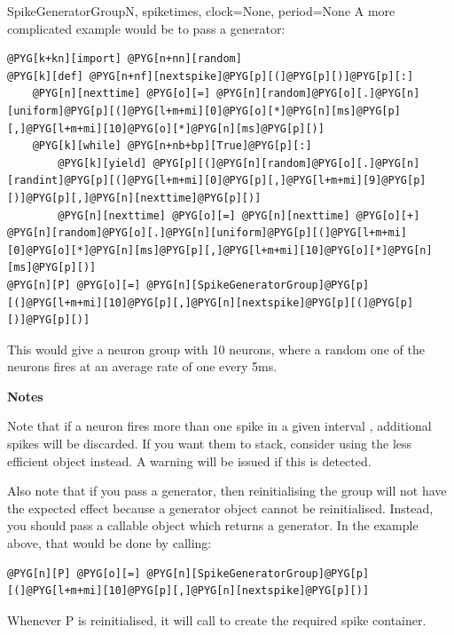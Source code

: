 \documentclass[letterpaper,10pt,english]{manual}
\begin{document}
\begin{classdesc}{SpikeGeneratorGroup}{N, spiketimes, clock=None, period=None}
A more complicated example would be to pass a generator:

\begin{Verbatim}[commandchars=@\[\]]
@PYG[k+kn][import] @PYG[n+nn][random]
@PYG[k][def] @PYG[n+nf][nextspike]@PYG[p][(]@PYG[p][)]@PYG[p][:]
    @PYG[n][nexttime] @PYG[o][=] @PYG[n][random]@PYG[o][.]@PYG[n][uniform]@PYG[p][(]@PYG[l+m+mi][0]@PYG[o][*]@PYG[n][ms]@PYG[p][,]@PYG[l+m+mi][10]@PYG[o][*]@PYG[n][ms]@PYG[p][)]
    @PYG[k][while] @PYG[n+nb+bp][True]@PYG[p][:]
        @PYG[k][yield] @PYG[p][(]@PYG[n][random]@PYG[o][.]@PYG[n][randint]@PYG[p][(]@PYG[l+m+mi][0]@PYG[p][,]@PYG[l+m+mi][9]@PYG[p][)]@PYG[p][,]@PYG[n][nexttime]@PYG[p][)]
        @PYG[n][nexttime] @PYG[o][=] @PYG[n][nexttime] @PYG[o][+] @PYG[n][random]@PYG[o][.]@PYG[n][uniform]@PYG[p][(]@PYG[l+m+mi][0]@PYG[o][*]@PYG[n][ms]@PYG[p][,]@PYG[l+m+mi][10]@PYG[o][*]@PYG[n][ms]@PYG[p][)]
@PYG[n][P] @PYG[o][=] @PYG[n][SpikeGeneratorGroup]@PYG[p][(]@PYG[l+m+mi][10]@PYG[p][,]@PYG[n][nextspike]@PYG[p][(]@PYG[p][)]@PYG[p][)]
\end{Verbatim}

This would give a neuron group  with 10 neurons, where a random one
of the neurons fires at an average rate of one every 5ms.

\textbf{Notes}

Note that if a neuron fires more than one spike in a given interval , additional
spikes will be discarded. If you want them to stack, consider using the less efficient
\hyperlink{brian.MultipleSpikeGeneratorGroup}{} object instead. A warning will be issued if this
is detected.

Also note that if you pass a generator, then reinitialising the group will not have the
expected effect because a generator object cannot be reinitialised. Instead, you should
pass a callable object which returns a generator. In the example above, that would be
done by calling:

\begin{Verbatim}[commandchars=@\[\]]
@PYG[n][P] @PYG[o][=] @PYG[n][SpikeGeneratorGroup]@PYG[p][(]@PYG[l+m+mi][10]@PYG[p][,]@PYG[n][nextspike]@PYG[p][)]
\end{Verbatim}

Whenever P is reinitialised, it will call  to create the required spike
container.
\end{classdesc}
\end{document}
